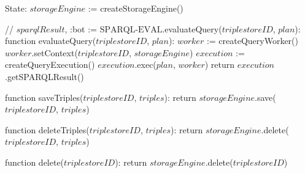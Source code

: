 State:
    $storageEngine$ := createStorageEngine()
    
// {$sparqlResult$, :bot} := $\textrm{SPARQL-EVAL}$.evaluateQuery($triplestoreID$, $plan$):
function evaluateQuery($triplestoreID$, $plan$):
    $worker$ := createQueryWorker()
    $worker$.setContext($triplestoreID$, $storageEngine$)
    $execution$ := createQueryExecution()
    $execution$.exec($plan$, $worker$)
    return $execution$.getSPARQLResult()

function saveTriples($triplestoreID$, $triples$):
    return $storageEngine$.save($triplestoreID$, $triples$)

function deleteTriples($triplestoreID$, $triples$):
    return $storageEngine$.delete($triplestoreID$, $triples$)

function delete($triplestoreID$):
    return $storageEngine$.delete($triplestoreID$)